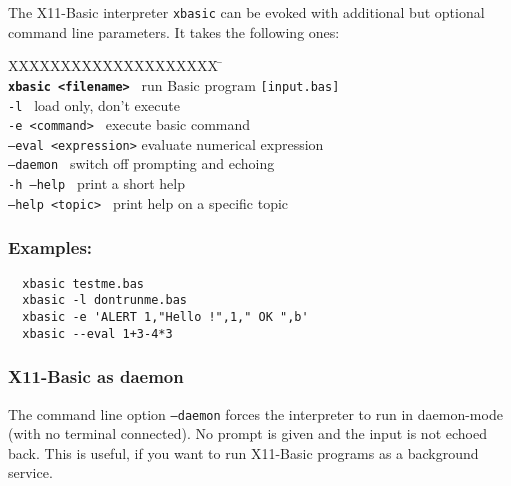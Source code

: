 The X11-Basic interpreter \verb|xbasic| can be evoked with  additional but
optional command line parameters. It takes the following ones:

\begin{tabbing}
XXXXXXXXXXXXXXXXXXXX \=\kill\\
  {\tt \bf xbasic <filename> }  \> run Basic program \verb|[input.bas]|\\
  {\tt -l                 } \> load only, don't execute\\
  {\tt -e <command>       }\> execute basic command \\
  {\tt --eval <expression>}   \> evaluate numerical expression  \\
  {\tt --daemon           } \> switch off prompting and echoing\\
  {\tt -h --help          } \> print a short help \\
  {\tt --help <topic>     } \> print help on a specific topic\\
\end{tabbing}

\begin{mdframed}[hidealllines=true,backgroundcolor=black!20]
\subsubsection*{Examples:}
\begin{verbatim}
  xbasic testme.bas
  xbasic -l dontrunme.bas
  xbasic -e 'ALERT 1,"Hello !",1," OK ",b'
  xbasic --eval 1+3-4*3
\end{verbatim}
\end{mdframed}

\subsubsection*{X11-Basic as daemon}

The  command line option {\tt --daemon} forces the interpreter to run in
daemon-mode (with no terminal connected).  No prompt is given and the 
input is not echoed back. This is useful, if you want to run X11-Basic
programs as a background service.
  
%


